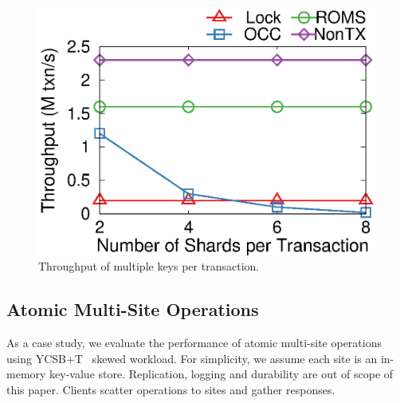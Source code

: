 \begin{figure}[t!]
\begin{minipage}{.31\textwidth}
		\centering
		\includegraphics[width=\textwidth]{gnuplot/multishard.eps}
		\caption{Throughput of multiple keys per transaction. }
		\label{fig:multishard}
    \end{minipage}
\end{figure}


\subsection{Atomic Multi-Site Operations}
\label{subsec:eval-kvs}



As a case study, we evaluate the performance of atomic multi-site operations using YCSB+T~\cite{dey2014ycsbt} skewed workload.
For simplicity, we assume each site is an in-memory key-value store.
Replication, logging and durability are out of scope of this paper.
Clients scatter operations to sites and gather responses.


